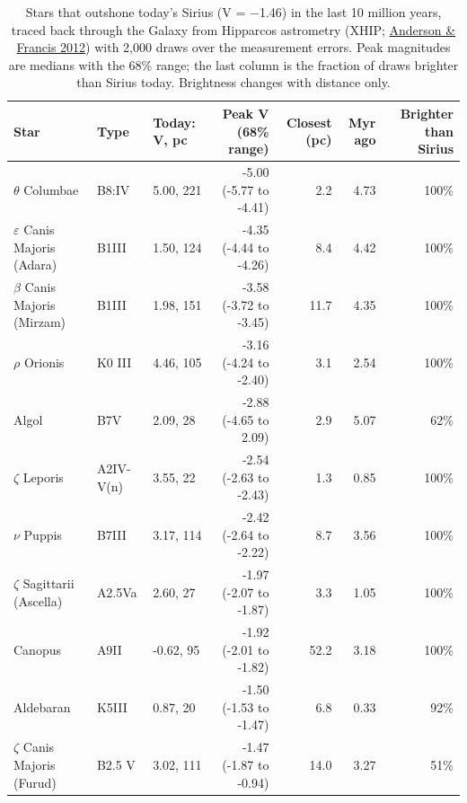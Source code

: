 \documentclass[9pt,twocolumn]{extarticle}
\begin{document}
\begin{table}[tp]\centering\footnotesize
\caption{Stars that outshone today's Sirius (V = $-$1.46) in the last 10 million years, traced back through the Galaxy from Hipparcos astrometry (XHIP; \protect\hyperlink{cite.anderson2012}{Anderson \& Francis 2012}) with 2,000 draws over the measurement errors. Peak magnitudes are medians with the 68\% range; the last column is the fraction of draws brighter than Sirius today. Brightness changes with distance only.}\label{tab:encounters}
\begin{tabularx}{\textwidth}{@{}Yllrrrr@{}}\toprule
Star & Type & Today: V, pc & Peak V (68\% range) & Closest (pc) & Myr ago & Brighter than Sirius \\ \midrule
$\theta$ Columbae & B8:IV & 5.00, 221 & -5.00 (-5.77 to -4.41) & 2.2 & 4.73 & 100\% \\
$\varepsilon$ Canis Majoris (Adara) & B1III & 1.50, 124 & -4.35 (-4.44 to -4.26) & 8.4 & 4.42 & 100\% \\
$\beta$ Canis Majoris (Mirzam) & B1III & 1.98, 151 & -3.58 (-3.72 to -3.45) & 11.7 & 4.35 & 100\% \\
$\rho$ Orionis & K0 III & 4.46, 105 & -3.16 (-4.24 to -2.40) & 3.1 & 2.54 & 100\% \\
Algol & B7V & 2.09, 28 & -2.88 (-4.65 to 2.09) & 2.9 & 5.07 & 62\% \\
$\zeta$ Leporis & A2IV-V(n) & 3.55, 22 & -2.54 (-2.63 to -2.43) & 1.3 & 0.85 & 100\% \\
$\nu$ Puppis & B7III & 3.17, 114 & -2.42 (-2.64 to -2.22) & 8.7 & 3.56 & 100\% \\
$\zeta$ Sagittarii (Ascella) & A2.5Va & 2.60, 27 & -1.97 (-2.07 to -1.87) & 3.3 & 1.05 & 100\% \\
Canopus & A9II & -0.62, 95 & -1.92 (-2.01 to -1.82) & 52.2 & 3.18 & 100\% \\
Aldebaran & K5III & 0.87, 20 & -1.50 (-1.53 to -1.47) & 6.8 & 0.33 & 92\% \\
$\zeta$ Canis Majoris (Furud) & B2.5 V & 3.02, 111 & -1.47 (-1.87 to -0.94) & 14.0 & 3.27 & 51\% \\
\bottomrule\end{tabularx}
\end{table}
\end{document}
